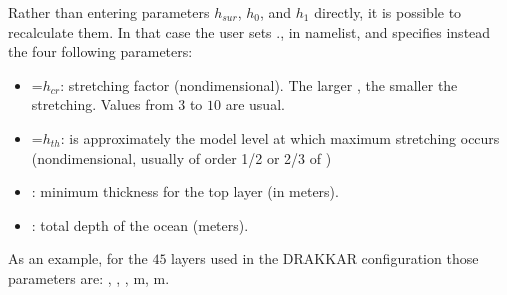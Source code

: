 \documentclass[../main/NEMO_manual]{subfiles}
\begin{document}
Rather than entering parameters $h_{sur}$, $h_{0}$, and $h_{1}$ directly, it is possible to recalculate them.
In that case the user sets \forcode{ = }\forcode{ = }.,
in  namelist, and specifies instead the four following parameters:
\begin{itemize}
\item
  =$h_{cr} $: stretching factor (nondimensional).
  The larger , the smaller the stretching.
  Values from $3$ to $10$ are usual.
\item
  =$h_{th} $: is approximately the model level at which maximum stretching occurs
  (nondimensional, usually of order 1/2 or 2/3 of )
\item
  : minimum thickness for the top layer (in meters).
\item
  : total depth of the ocean (meters).
\end{itemize}
As an example, for the $45$ layers used in the DRAKKAR configuration those parameters are:
, , ,
m, m.
\end{document}

